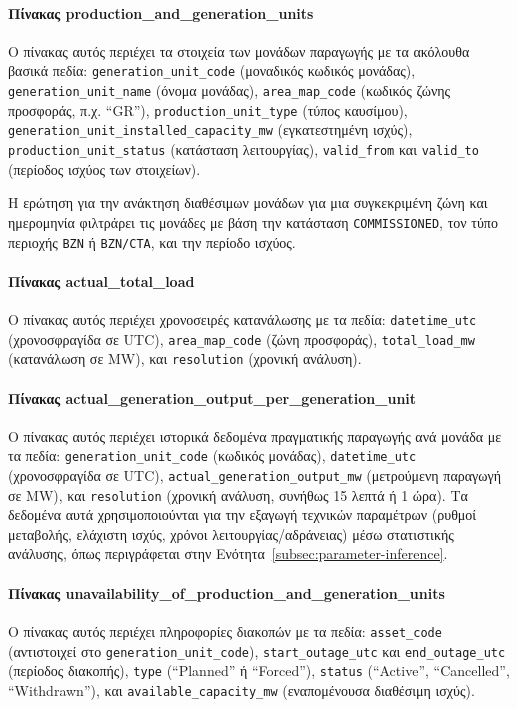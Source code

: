 \paragraph{Πίνακας production\_and\_generation\_units}
Ο πίνακας αυτός περιέχει τα στοιχεία των μονάδων παραγωγής με τα ακόλουθα βασικά πεδία: \texttt{generation\_unit\_code} (μοναδικός κωδικός μονάδας), \texttt{generation\_unit\_name} (όνομα μονάδας), \texttt{area\_map\_code} (κωδικός ζώνης προσφοράς, π.χ. ``GR''), \texttt{production\_unit\_type} (τύπος καυσίμου), \texttt{generation\_unit\_installed\_capacity\_mw} (εγκατεστημένη ισχύς), \texttt{production\_unit\_status} (κατάσταση λειτουργίας), \texttt{valid\_from} και \texttt{valid\_to} (περίοδος ισχύος των στοιχείων).

Η ερώτηση για την ανάκτηση διαθέσιμων μονάδων για μια συγκεκριμένη ζώνη και ημερομηνία φιλτράρει τις μονάδες με βάση την κατάσταση \texttt{COMMISSIONED}, τον τύπο περιοχής \texttt{BZN} ή \texttt{BZN/CTA}, και την περίοδο ισχύος.

\paragraph{Πίνακας actual\_total\_load}
Ο πίνακας αυτός περιέχει χρονοσειρές κατανάλωσης με τα πεδία: \texttt{datetime\_utc} (χρονοσφραγίδα σε UTC), \texttt{area\_map\_code} (ζώνη προσφοράς), \texttt{total\_load\_mw} (κατανάλωση σε MW), και \texttt{resolution} (χρονική ανάλυση).

\paragraph{Πίνακας actual\_generation\_output\_per\_generation\_unit}
Ο πίνακας αυτός περιέχει ιστορικά δεδομένα πραγματικής παραγωγής ανά μονάδα με τα πεδία: \texttt{generation\_unit\_code} (κωδικός μονάδας), \texttt{datetime\_utc} (χρονοσφραγίδα σε UTC), \texttt{actual\_generation\_output\_mw} (μετρούμενη παραγωγή σε MW), και \texttt{resolution} (χρονική ανάλυση, συνήθως 15 λεπτά ή 1 ώρα). Τα δεδομένα αυτά χρησιμοποιούνται για την εξαγωγή τεχνικών παραμέτρων (ρυθμοί μεταβολής, ελάχιστη ισχύς, χρόνοι λειτουργίας/αδράνειας) μέσω στατιστικής ανάλυσης, όπως περιγράφεται στην Ενότητα~\ref{subsec:parameter-inference}.

\paragraph{Πίνακας unavailability\_of\_production\_and\_generation\_units}
Ο πίνακας αυτός περιέχει πληροφορίες διακοπών με τα πεδία: \texttt{asset\_code} (αντιστοιχεί στο \texttt{generation\_unit\_code}), \texttt{start\_outage\_utc} και \texttt{end\_outage\_utc} (περίοδος διακοπής), \texttt{type} (``Planned'' ή ``Forced''), \texttt{status} (``Active'', ``Cancelled'', ``Withdrawn''), και \texttt{available\_capacity\_mw} (εναπομένουσα διαθέσιμη ισχύς).

